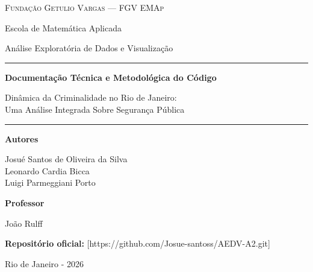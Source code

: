 \documentclass[11pt,a4paper]{article}
\begin{document}
\begin{titlepage}
  \centering
  \vspace*{1.2cm}

  {\scshape\large Fundação Getulio Vargas --- FGV EMAp\par}
  \vspace{0.25cm}
  {\normalsize Escola de Matemática Aplicada\par}
  \vspace{0.15cm}
  {\normalsize Análise Exploratória de Dados e Visualização\par}

  \vspace{3.0cm}

  \rule{\linewidth}{0.8pt}\par
  \vspace{0.6cm}
  {\LARGE\bfseries Documentação Técnica e Metodológica do Código\par}
  \vspace{0.45cm}
  {\large Dinâmica da Criminalidade no Rio de Janeiro:\\
  Uma Análise Integrada Sobre Segurança Pública\par}
  \vspace{0.6cm}
  \rule{\linewidth}{0.8pt}\par

  \vspace{2.6cm}

  {\normalsize\textbf{Autores}\par}
  \vspace{0.3cm}
  {\normalsize
    Josué Santos de Oliveira da Silva\\
    Leonardo Cardia Bicca\\
    Luigi Parmeggiani Porto\par
  }

  \vspace{1.2cm}

  {\normalsize\textbf{Professor}\par}
  \vspace{0.2cm}
  {\normalsize João Rulff\par}

  \vfill

  {\small\textbf{Repositório oficial:} [https://github.com/Josue-santoss/AEDV-A2.git]\par}
  \vspace{0.3cm}
  {\small Rio de Janeiro - 2026\par}
\end{titlepage}
\end{document}
